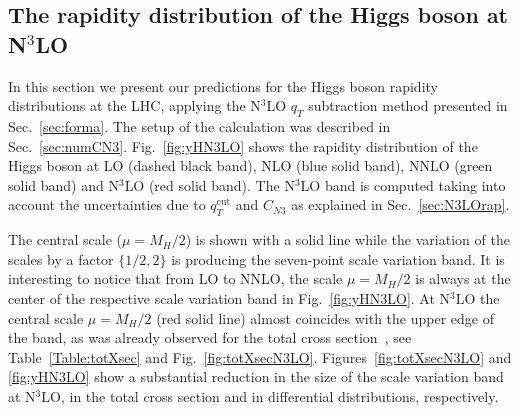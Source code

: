 \documentclass[12pt]{article}
\DeclareRobustCommand{\qt}{q_T}
\DeclareRobustCommand{\qtcut}{\ensuremath{q_T^\mathrm{cut}}}
\begin{document}
\subsection{The rapidity distribution of the Higgs boson at N$^{3}$LO}
\label{sec:results}

In this section we present our predictions for the Higgs boson rapidity distributions at the LHC, applying the N$^{3}$LO $\qt$ subtraction method presented in Sec.~\ref{sec:forma}. The setup of the calculation was described in Sec.~\ref{sec:numCN3}. Fig.~\ref{fig:yHN3LO} shows the rapidity distribution of the Higgs boson at LO (dashed black band), NLO (blue solid band), NNLO (green solid band) and N$^{3}$LO (red solid band). The N$^{3}$LO band is computed taking into account the uncertainties due to $\qtcut$ and $C_{N3}$  as explained in Sec.~\ref{sec:N3LOrap}.

The central scale ($\mu=M_{H}/2$) is shown with a solid line while the variation of the scales by a factor $\{1/2,2\}$ is producing the seven-point scale variation band. It is interesting to notice that from LO to NNLO, the scale $\mu=M_{H}/2$ is always at the center of the respective scale variation band in Fig.~\ref{fig:yHN3LO}.  At N$^{3}$LO the central scale $\mu=M_{H}/2$ (red solid line) almost coincides with the upper edge of the band, as was already observed for the total cross section~\cite{Anastasiou:2015ema,Mistlberger:2018etf}, see 
Table~\ref{Table:totXsec} and Fig.~\ref{fig:totXsecN3LO}.
Figures~\ref{fig:totXsecN3LO} and \ref{fig:yHN3LO} show a substantial reduction in the size of the scale variation band at N$^{3}$LO, in the total cross section and in differential distributions, respectively.  
\end{document}
